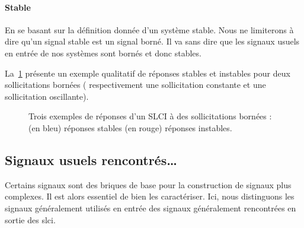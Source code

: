 \paragraph{Stable}
En se basant sur la définition donnée d'un système stable.
Nous ne limiterons à dire qu'un signal stable est un signal 
borné. Il va sans dire que les signaux usuels en entrée
de nos systèmes sont bornés et donc stables.

La~\cref{fig-stabilite_signaux} présente un exemple qualitatif de réponses 
stables et instables pour deux sollicitations bornées ( respectivement une 
sollicitation constante et une sollicitation oscillante).
\begin{figure}[!ht]
    \centering
    
    
    

    
    
    
    \caption{Trois exemples de réponses d'un SLCI à des sollicitations bornées :
            (en bleu)  réponses stables 
            (en rouge) réponses instables.\label{fig-stabilite_signaux}}
\end{figure}
\newpage
{}
\captionsetup{width=0.9\linewidth}
\subsection{Signaux usuels rencontrés\ldots\label{sec-signaux_usuels}}
Certains signaux sont des briques de base pour la construction de
signaux plus complexes. Il est alors essentiel de bien les caractériser.
Ici, nous distinguons les signaux généralement utilisés en 
entrée des signaux généralement rencontrées en sortie des \gls{slci}.
